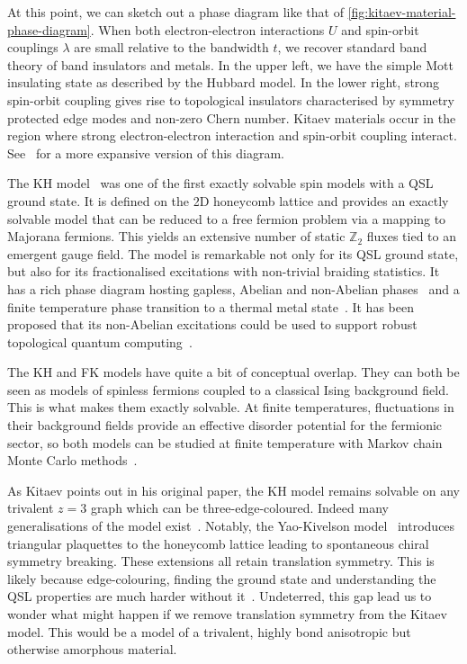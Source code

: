 At this point, we can sketch out a phase diagram like that of \cref{fig:kitaev-material-phase-diagram}. When both electron-electron interactions \(U\) and spin-orbit couplings \(\lambda\) are small relative to the bandwidth \(t\), we recover standard band theory of band insulators and metals. In the upper left, we have the simple Mott insulating state as described by the Hubbard model. In the lower right, strong spin-orbit coupling gives rise to topological insulators characterised by symmetry protected edge modes and non-zero Chern number. Kitaev materials occur in the region where strong electron-electron interaction and spin-orbit coupling interact. See~\autocite{witczak-krempaCorrelatedQuantumPhenomena2014} for a more expansive version of this diagram.

The KH model~\autocite{kitaevAnyonsExactlySolved2006} was one of the first exactly solvable spin models with a QSL ground state. It is defined on the 2D honeycomb lattice and provides an exactly solvable model that can be reduced to a free fermion problem via a mapping to Majorana fermions. This yields an extensive number of static \(\mathbb Z_2\) fluxes tied to an emergent gauge field. The model is remarkable not only for its QSL ground state, but also for its fractionalised excitations with non-trivial braiding statistics. It has a rich phase diagram hosting gapless, Abelian and non-Abelian phases~\autocite{knolleDynamicsFractionalizationQuantum2015} and a finite temperature phase transition to a thermal metal state~\autocite{selfThermallyInducedMetallic2019}. It has been proposed that its non-Abelian excitations could be used to support robust topological quantum computing~\autocite{kitaev_fault-tolerant_2003,freedmanTopologicalQuantumComputation2003,nayakNonAbelianAnyonsTopological2008}.

The KH and FK models have quite a bit of conceptual overlap. They can both be seen as models of spinless fermions coupled to a classical Ising background field. This is what makes them exactly solvable. At finite temperatures, fluctuations in their background fields provide an effective disorder potential for the fermionic sector, so both models can be studied at finite temperature with Markov chain Monte Carlo methods~\autocite{antipovInteractionTunedAndersonMott2016,selfThermallyInducedMetallic2019}.

As Kitaev points out in his original paper, the KH model remains solvable on any trivalent \(z=3\) graph which can be three-edge-coloured. Indeed many generalisations of the model exist~\autocite{Baskaran2007,Baskaran2008,Nussinov2009,OBrienPRB2016,hermanns2015weyl}. Notably, the Yao-Kivelson model~\autocite{yaoExactChiralSpin2007} introduces triangular plaquettes to the honeycomb lattice leading to spontaneous chiral symmetry breaking. These extensions all retain translation symmetry. This is likely because edge-colouring, finding the ground state and understanding the QSL properties are much harder without it~\autocite{eschmann2019thermodynamics,Peri2020}. Undeterred, this gap lead us to wonder what might happen if we remove translation symmetry from the Kitaev model. This would be a model of a trivalent, highly bond anisotropic but otherwise amorphous material.

